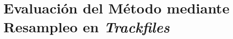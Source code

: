 \chapter{Evaluación del Método mediante Resampleo en \emph{Trackfiles}}
\label{chap:evaluacion-trackfiles}





    
